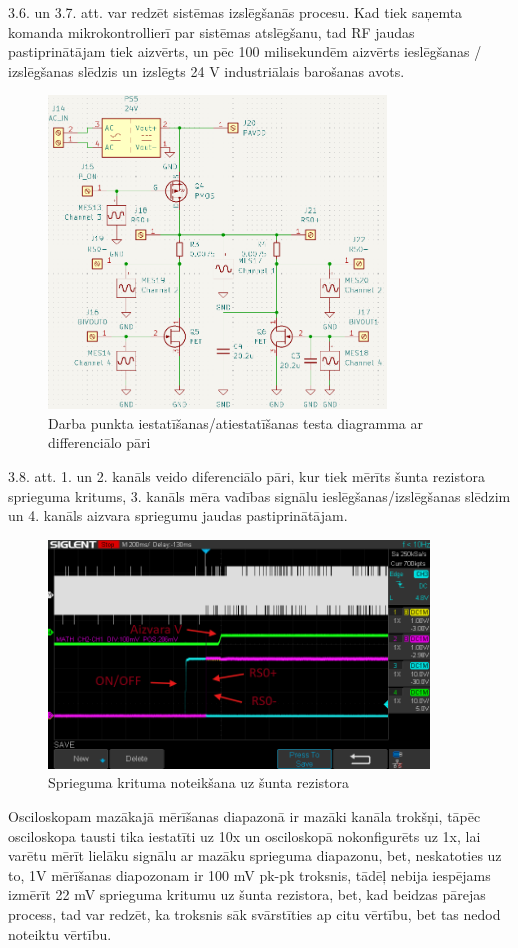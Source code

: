 3.6. un 3.7. att. var redzēt sistēmas izslēgšanās procesu. Kad tiek saņemta komanda mikrokontrollierī par sistēmas atslēgšanu, tad RF jaudas pastiprinātājam tiek aizvērts, un pēc 100 milisekundēm aizvērts ieslēgšanas / izslēgšanas slēdzis un izslēgts 24 V industriālais barošanas avots.
\begin{figure}[H]
	\centering
    \includegraphics[width=0.8\textwidth]{pictures/test_diagram4.png}\hspace{1cm}
    \caption{Darba punkta iestatīšanas/atiestatīšanas testa diagramma ar differenciālo pāri}
\end{figure}
3.8. att. 1. un 2. kanāls veido diferenciālo pāri, kur tiek mērīts šunta rezistora sprieguma kritums, 3. kanāls mēra vadības signālu ieslēgšanas/izslēgšanas slēdzim un 4. kanāls aizvara spriegumu jaudas pastiprinātājam.
\begin{figure}[H]
	\centering
    \includegraphics[width=0.9\textwidth]{pictures/current.png}\hspace{1cm}
    \caption{Sprieguma krituma noteikšana uz šunta rezistora}
\end{figure}
 Osciloskopam mazākajā mērīšanas diapazonā ir mazāki kanāla trokšņi, tāpēc osciloskopa tausti tika iestatīti uz 10x un osciloskopā nokonfigurēts uz 1x, lai varētu mērīt lielāku signālu ar mazāku sprieguma diapazonu, bet, neskatoties uz to, 1V mērīšanas diapozonam ir 100 mV pk-pk troksnis, tādēļ nebija iespējams izmērīt 22 mV sprieguma kritumu uz šunta rezistora, bet, kad beidzas pārejas process, tad var redzēt, ka troksnis sāk svārstīties ap citu vērtību, bet tas nedod noteiktu vērtību.